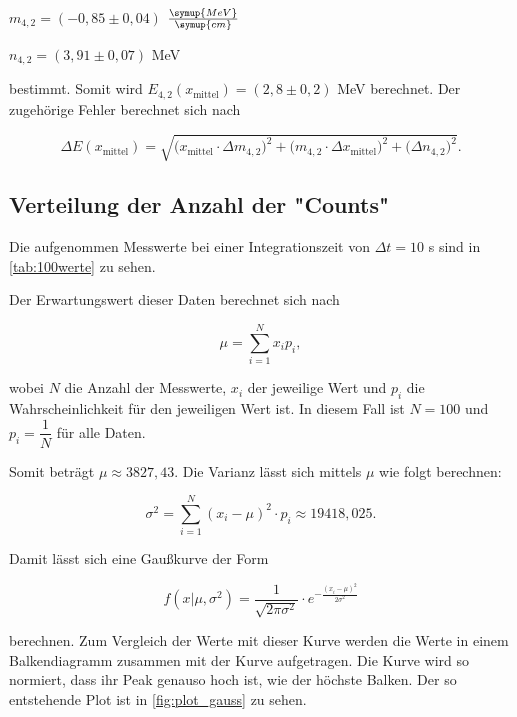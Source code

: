 \begin{center}
    $m_{4,2} = (-0,85 \pm 0,04)$ $\frac{\symup{MeV}}{\symup{cm}}$

    $n_{4,2} = (3,91 \pm 0,07)$ MeV
\end{center}

bestimmt.
Somit wird $E_{4,2}(x_\text{mittel}) = (2,8 \pm 0,2)$ MeV berechnet. Der zugehörige Fehler berechnet sich nach

\begin{equation}
    \Delta E(x_\text{mittel}) = \sqrt{\bigg( x_\text{mittel} \cdot \Delta m_{4,2} \bigg)^2 + \bigg(m_{4,2} \cdot \Delta x_\text{mittel} \bigg)^2 + \bigg(\Delta n_{4,2} \bigg)^2}.
\end{equation}




\subsection{Verteilung der Anzahl der "Counts"}

Die aufgenommen Messwerte bei einer Integrationszeit von $\Delta t = 10$ s sind in \autoref{tab:100werte} zu sehen.



Der Erwartungswert dieser Daten berechnet sich nach

\begin{equation}
    \mu = \sum_{i=1}^{N} x_i p_i,
\end{equation}

wobei $N$ die Anzahl der Messwerte, $x_i$ der jeweilige Wert und $p_i$ die Wahrscheinlichkeit für den jeweiligen Wert ist.
In diesem Fall ist $N = 100$ und $p_i = \dfrac{1}{N}$ für alle Daten.

Somit beträgt $\mu \approx 3827,43$.
Die Varianz lässt sich mittels $\mu$ wie folgt berechnen:

\begin{equation}
    \sigma^2 = \sum_{i=1}^{N} (x_i - \mu)^2 \cdot p_i \approx 19418,025.
\end{equation}

Damit lässt sich eine Gaußkurve der Form

\begin{equation}
    f(x | \mu, \sigma^2) = \frac{1}{\sqrt{2 \pi \sigma^2}} \cdot e^{- \frac{(x_i - \mu)^2}{2 \sigma^2}}
\end{equation}

berechnen. Zum Vergleich der Werte mit dieser Kurve werden die Werte in einem Balkendiagramm zusammen mit der Kurve aufgetragen.
Die Kurve wird so normiert, dass ihr Peak genauso hoch ist, wie der höchste Balken. Der so entstehende Plot ist in \autoref{fig:plot_gauss} zu sehen.

